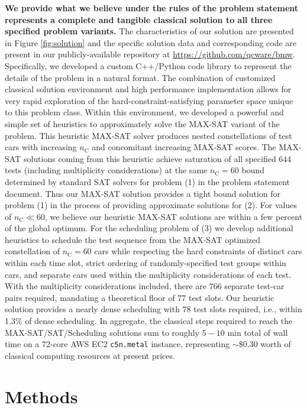 \documentclass[aps,pra,twocolumn,superscriptaddress,groupedaddress]{revtex4}  %
\begin{document}
\textbf{We provide what we believe under the rules of the problem statement
represents a complete and tangible classical solution to all three specified
problem variants.} 
The characteristics of our solution are presented in Figure \ref{fig:solution}
and the specific solution data and corresponding code are present in our
publicly-available repository at
\href{https://github.com/qcware/bmw}{https://github.com/qcware/bmw}.
Specifically, we developed a custom C++/Python code library to represent the
details of the problem in a natural format. 
The combination of customized classical solution environment and high
performance implementation allows for very rapid exploration of the
hard-constraint-satisfying parameter space unique to this problem class.  Within
this environment, we developed a powerful and simple set of heuristics to
approximately solve the MAX-SAT variant of the problem. This heuristic MAX-SAT
solver produces nested constellations of test cars with increasing
$n_{\mathrm{C}}$ and concomitant increasing MAX-SAT scores. The MAX-SAT
solutions coming from this heuristic achieve saturation of all specified $644$
tests (including multiplicity considerations) at the same $n_{\mathrm{C}} = 60$
bound determined by standard SAT solvers for problem (1) in the problem
statement document. Thus our MAX-SAT solution provides a tight bound solution
for problem (1) in the process of providing approximate solutions for (2). For
values of $n_{\mathrm{C}} \ll 60$, we believe our heuristic MAX-SAT solutions
are within a few percent of the global optimum. For the scheduling problem of
(3) we develop additional heuristics to schedule the test sequence from the
MAX-SAT optimized constellation of $n_{\mathrm{C}} = 60$ cars while respecting
the hard constraints of distinct cars within each time slot, strict ordering of
randomly-specified test groups within cars, and separate cars used within the
multiplicity considerations of each test. With the multiplicity considerations
included, there are 766 separate test-car pairs required, mandating a
theoretical floor of 77 test slots. Our heuristic solution provides a nearly
dense scheduling with 78 test slots required, i.e., within 1.3$\%$ of dense
scheduling. In aggregate, the classical steps required to reach the
MAX-SAT/SAT/Scheduling solutions sum to roughly $5-10$ min total of wall time on
a 72-core AWS EC2 \texttt{c5n.metal} instance, representing $\sim \$0.30$ worth
of classical computing resources at present prices.

\section{Methods}
\end{document}
